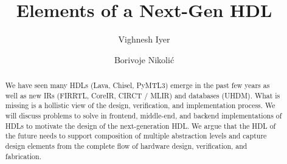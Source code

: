 \documentclass[sigplan,review,nonacm]{acmart}
\begin{document}
\title{Elements of a Next-Gen HDL}


\author{Vighnesh Iyer}

\author{Borivoje Nikolić}




\begin{abstract}
We have seen many HDLs (Lava, Chisel, PyMTL3) emerge in the past few years as well as new IRs (FIRRTL, CoreIR, CIRCT / MLIR) and databases (UHDM).
What is missing is a hollistic view of the design, verification, and implementation process.
We will discuss problems to solve in frontend, middle-end, and backend implementations of HDLs to motivate the design of the next-generation HDL.
We argue that the HDL of the future needs to support composition of multiple abstraction levels and capture design elements from the complete flow of hardware design, verification, and fabrication.
\end{abstract}


\maketitle
\end{document}
